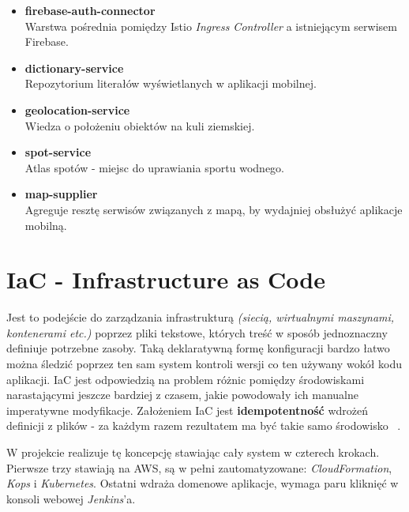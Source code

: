 \begin{itemize}
    \item
    \textbf{firebase-auth-connector}\\ 
    Warstwa pośrednia pomiędzy Istio \emph{Ingress Controller} a istniejącym serwisem Firebase.
    
    \item
    \textbf{dictionary-service}\\ 
    Repozytorium literałów wyświetlanych w aplikacji mobilnej.

    \item
    \textbf{geolocation-service}\\ 
    Wiedza o położeniu obiektów na kuli ziemskiej.

    \item
    \textbf{spot-service}\\ 
    Atlas spotów - miejsc do uprawiania sportu wodnego.

    \item
    \textbf{map-supplier}\\ 
    Agreguje resztę serwisów związanych z mapą, by wydajniej obsłużyć aplikacje mobilną.
\end{itemize} 




\section{IaC - Infrastructure as Code}
\label{iac:section}

Jest to podejście do zarządzania infrastrukturą \emph{(siecią, wirtualnymi maszynami, kontenerami etc.)} poprzez pliki tekstowe, 
których treść w sposób jednoznaczny definiuje potrzebne zasoby. 
Taką deklaratywną formę konfiguracji bardzo łatwo można śledzić poprzez ten sam system kontroli wersji co ten używany wokół kodu aplikacji.
IaC jest odpowiedzią na problem różnic pomiędzy środowiskami narastającymi jeszcze bardziej z czasem, jakie powodowały ich manualne imperatywne modyfikacje.
Założeniem IaC jest \textbf{idempotentność} wdrożeń definicji z plików - za każdym razem rezultatem ma być takie samo środowisko ~\cite{iac-ms}.

W projekcie realizuje tę koncepcję stawiając cały system w czterech krokach. 
Pierwsze trzy stawiają  na AWS, są w pełni zautomatyzowane: \emph{CloudFormation}, \emph{Kops} i \emph{Kubernetes}.
Ostatni wdraża domenowe aplikacje, wymaga paru kliknięć w konsoli webowej \emph{Jenkins}'a. 

